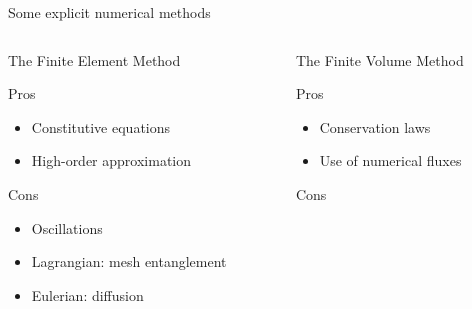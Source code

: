 \begin{withoutheadline}
\begin{frame}{Some explicit numerical methods}
\begin{overprint}
\begin{columns}
\begin{column}{0.49\textwidth}
\begin{block}{The Finite Element Method \cite{Belytschko}}
            \begin{footnotesize}
              \begin{block}{\footnotesize Pros}
                \vspace{-0.2cm}
                \begin{itemize}
                \item[] Constitutive equations
                \item[] High-order approximation 
                \end{itemize}
              \end{block}
              \vspace{-0.2cm}
              \begin{block}{\footnotesize Cons}
                \vspace{-0.2cm}
                \begin{itemize}
                \item[] Oscillations
                \item[] Lagrangian: mesh entanglement 
                \item[] Eulerian: diffusion
                \end{itemize}
              \end{block}
            \end{footnotesize}
          \end{block}
        \end{column}
        \begin{column}{0.49\textwidth}
          \begin{block}{The Finite Volume Method \cite{Leveque}}
            \begin{footnotesize}
              \begin{block}{\footnotesize Pros}
                \vspace{-0.2cm}
                \begin{itemize}
                \item[] Conservation laws %
                \item[] Use of numerical fluxes \cite{Godunov_method}
                \end{itemize}
              \end{block}
              \vspace{-0.2cm}
              \begin{block}{\footnotesize Cons}
                \vspace{-0.2cm}
                \begin{itemize}

\end{itemize}
\end{block}
\end{footnotesize}
\end{block}
\end{column}
\end{columns}
\end{overprint}
\end{frame}
\end{withoutheadline}
